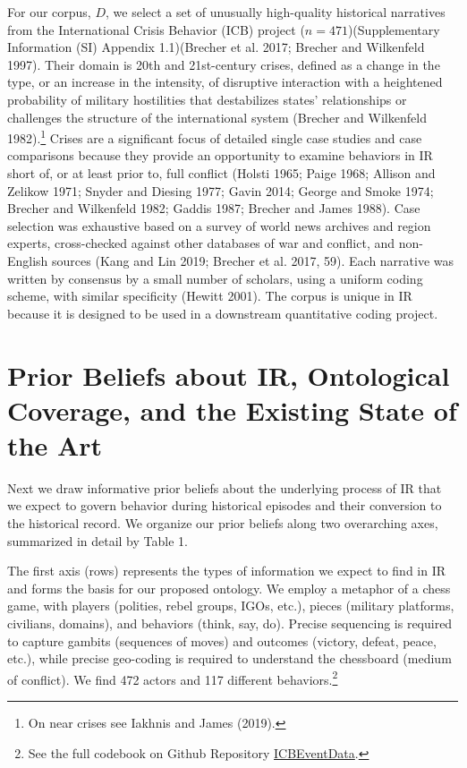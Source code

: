 \documentclass{article}
\begin{document}
For our corpus, \(D\), we select a set of unusually high-quality
historical narratives from the International Crisis Behavior (ICB)
project (\(n=471\))(Supplementary Information (SI) Appendix 1.1)(Brecher
et al. 2017; Brecher and Wilkenfeld 1997). Their domain is 20th and
21st-century crises, defined as a change in the type, or an increase in
the intensity, of disruptive interaction with a heightened probability
of military hostilities that destabilizes states' relationships or
challenges the structure of the international system (Brecher and
Wilkenfeld 1982).\footnote{On near crises see Iakhnis and James (2019).}
Crises are a significant focus of detailed single case studies and case
comparisons because they provide an opportunity to examine behaviors in
IR short of, or at least prior to, full conflict (Holsti 1965; Paige
1968; Allison and Zelikow 1971; Snyder and Diesing 1977; Gavin 2014;
George and Smoke 1974; Brecher and Wilkenfeld 1982; Gaddis 1987; Brecher
and James 1988). Case selection was exhaustive based on a survey of
world news archives and region experts, cross-checked against other
databases of war and conflict, and non-English sources (Kang and Lin
2019; Brecher et al. 2017, 59). Each narrative was written by consensus
by a small number of scholars, using a uniform coding scheme, with
similar specificity (Hewitt 2001). The corpus is unique in IR because it
is designed to be used in a downstream quantitative coding project.

\hypertarget{prior-beliefs-about-ir-ontological-coverage-and-the-existing-state-of-the-art}{%
\section{Prior Beliefs about IR, Ontological Coverage, and the Existing
State of the
Art}\label{prior-beliefs-about-ir-ontological-coverage-and-the-existing-state-of-the-art}}

Next we draw informative prior beliefs about the underlying process of
IR that we expect to govern behavior during historical episodes and
their conversion to the historical record. We organize our prior beliefs
along two overarching axes, summarized in detail by Table 1.

The first axis (rows) represents the types of information we expect to
find in IR and forms the basis for our proposed ontology. We employ a
metaphor of a chess game, with players (polities, rebel groups, IGOs,
etc.), pieces (military platforms, civilians, domains), and behaviors
(think, say, do). Precise sequencing is required to capture gambits
(sequences of moves) and outcomes (victory, defeat, peace, etc.), while
precise geo-coding is required to understand the chessboard (medium of
conflict). We find 472 actors and 117 different behaviors.\footnote{See
  the full codebook on Github Repository
  \href{https://urldefense.com/v3/__https://github.com/CenterForPeaceAndSecurityStudies/ICBEventData__;!!Mih3wA!WxDJtEczKfxGTh0S2Krunap8ReymFEL5iTWaSfOHeqlSdyfRx77zmjBSWO1OAm13$}{ICBEventData}.}
\end{document}
